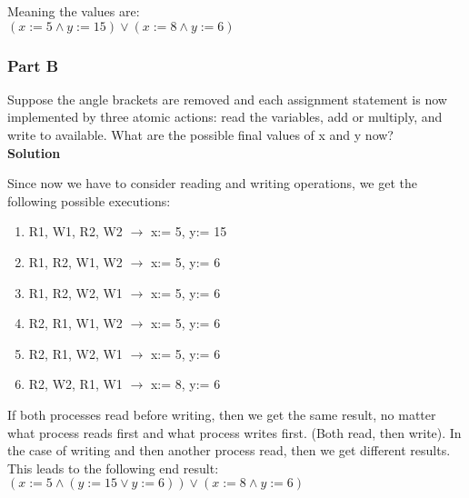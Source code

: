 Meaning the values are: \\
$(x:=5 \land y:=15) \lor (x:=8 \land y:=6)$


\subsubsection{Part B}

Suppose the angle brackets are removed and each assignment statement is now implemented by three atomic actions: 
read the variables, add or multiply, and write to available. What are the possible final values of x and y now? \\

\textbf{Solution} 

Since now we have to consider reading and writing operations, we get the following possible executions: 
\begin{enumerate}
    \item R1, W1, R2, W2 $\to$ x:= 5, y:= 15 
    \item R1, R2, W1, W2 $\to$ x:= 5, y:= 6 
    \item R1, R2, W2, W1 $\to$ x:= 5, y:= 6
    \item R2, R1, W1, W2 $\to$ x:= 5, y:= 6
    \item R2, R1, W2, W1 $\to$ x:= 5, y:= 6 
    \item R2, W2, R1, W1 $\to$ x:= 8, y:= 6 
\end{enumerate}

If both processes read before writing, then we get the same result, no matter what process reads first and what process writes first.
(Both read, then write). In the case of writing and then another process read, then we get different results. This leads to the following end result: \\
$(x := 5 \land (y:= 15 \lor y:= 6)) \lor (x:= 8 \land y:= 6)$
